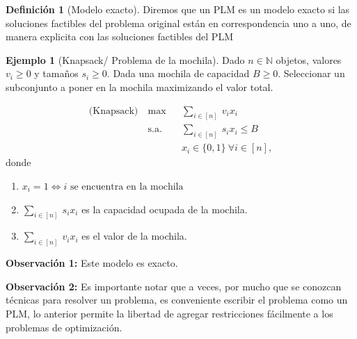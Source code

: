 \documentclass[10pt]{article}
\newcommand{\NN}{\mathbb N}
\theoremstyle{plain}
\theoremstyle{definition}
\newtheorem{defi}{Definición}
\newtheorem{eje}{Ejemplo}
\begin{document}
\begin{defi}[Modelo exacto] Diremos que un PLM es un modelo exacto si las soluciones factibles del problema original están en correspondencia uno a uno, de manera explicita con las soluciones factibles del PLM
\end{defi}

\begin{eje}[Knapsack/ Problema de la mochila] Dado $n \in \NN$ objetos, valores $v_{i} \geq 0$ y tamaños $s_{i} \geq 0$. Dada una mochila de capacidad $B \geq 0$. Seleccionar un subconjunto a poner en la mochila maximizando el valor total.

\begin{equation*}
\begin{aligned}
\textrm{(Knapsack)}~ & \max
& & \displaystyle{\sum_{i \in [n]}}~v_{i}x_{i}\\
& \text{s.a.}
& & \displaystyle{\sum_{i \in [n]}}~s_{i}x_{i} \leq B\\
&&& x_{i} \in\{0,1\} ~ \forall i \in [n],
\end{aligned}
\end{equation*}
\newpage
donde
\begin{enumerate}
    \item $x_{i}=1 \iff i \text{  se encuentra en la mochila}$
    \item $\displaystyle{\sum_{i \in [n]}}~s_{i}x_{i}$ es la capacidad ocupada de la mochila.
    \item $\displaystyle{\sum_{i \in [n]}}~v_{i}x_{i}$ es el valor de la mochila.
\end{enumerate}

\end{eje}

\textbf{Observación 1:} Este modelo es exacto.

\textbf{Observación 2:} Es importante notar que a veces, por mucho que se conozcan técnicas para resolver un problema, es conveniente escribir el problema como un PLM, lo anterior permite la libertad de agregar restricciones fácilmente a los problemas de optimización.
\end{document}
